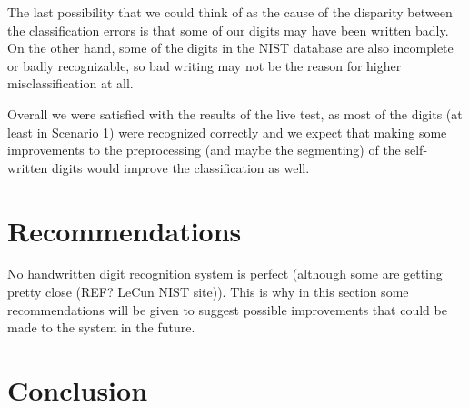 \documentclass[11pt,twoside,a4paper]{article}
\begin{document}
The last possibility that we could think of as the cause of the disparity between the classification errors is that some of our digits may have been written badly. On the other hand, some of the digits in the NIST database are also incomplete or badly recognizable, so bad writing may not be the reason for higher misclassification at all.

Overall we were satisfied with the results of the live test, as most of the digits (at least in Scenario 1) were recognized correctly and we expect that making some improvements to the preprocessing (and maybe the segmenting) of the self-written digits would improve the classification as well.

\section{Recommendations}
No handwritten digit recognition system is perfect (although some are getting pretty close (REF? LeCun NIST site)). This is why in this section some recommendations will be given to suggest possible improvements that could be made to the system in the future.

\section{Conclusion}
\end{document}
